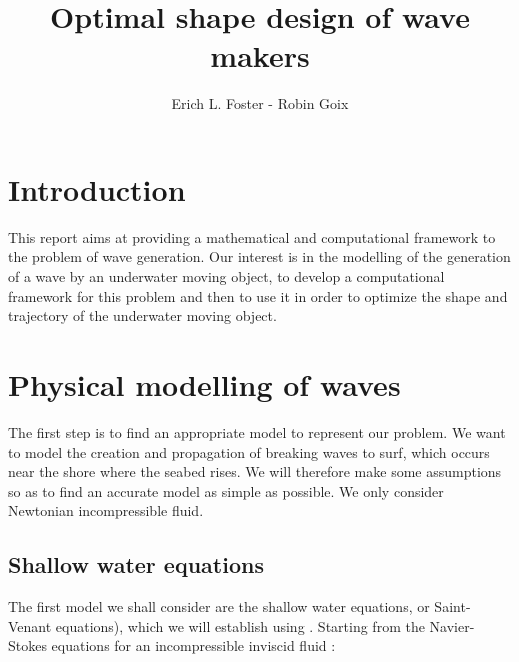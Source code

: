 \documentclass[11pt,a4paper]{article}
\author{Erich L. Foster - Robin Goix}
\title{Optimal shape design of wave makers}
\begin{document}
\maketitle

\tableofcontents
{}
\pagebreak
\section*{Introduction}
This report aims at providing a mathematical and computational framework to the problem of wave generation. Our interest is in the modelling of the generation of a wave by an underwater moving object, to develop a computational framework for this problem and then to use it in order to optimize the shape and trajectory of the underwater moving object.

\pagebreak
\section{Physical modelling of waves}
The first step is to find an appropriate model to represent our problem. 
We want to model the creation and propagation of breaking waves to surf, which occurs near the shore where the seabed rises. We will therefore make some assumptions so as to find an accurate model as simple as possible. We only consider Newtonian incompressible fluid.

\subsection{Shallow water equations}

The first model we shall consider are the shallow water equations, or Saint-Venant equations), which we will establish using \cite{JMC2013}.
Starting from the Navier-Stokes equations for an incompressible inviscid fluid : 
\end{document}
